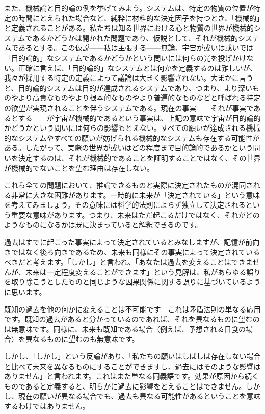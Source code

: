 \documentclass[a4paper,11pt,openany]{ltjsbook}
\begin{document}
また、機械論と目的論の例を挙げてみよう。システムは、特定の物質の位置が特定の時間にとえられた場合など、純粋に材料的な決定因子を持つとき、「機械的」と定義されることがある。私たちは知る世界における心と物質の世界が機械的システムであるかどうかは開かれた問題であり、仮説として、それが機械的システムであるとする。この仮説——私は主張する——無論、宇宙が或いは或いでは「目的論的」なシステムであるかどうかという問いには何らの光を投げかけない。正確に言えば、「目的論的」なシステムとは何かを定義するのは難しいが、我々が採用する特定の定義によって議論は大きく影響されない。大まかに言うと、目的論的システムは目的が達成されるシステムであり、つまり、より深いものやより高貴なものやより根本的なものやより普遍的なものなどと呼ばれる特定の欲望が実現されることを伴うシステムである。現在の事実——それが事実であるとする——が宇宙が機械的であるという事実は、上記の意味で宇宙が目的論的かどうかという問いには何らの影響もとえない。すべての願いが達成される機械的なシステムやすべての願いが妨げられる機械的なシステムも存在する可能性がある。したがって、実際の世界が或いはどの程度まで目的論的であるかという問いを決定するのは、それが機械的であることを証明することではなく、その世界が機械的でないことを望む理由は存在しない。

これら全ての問題において、推論できるものと実際に決定されたものが混同される非常に大きな困難があります。一時的に未来が「決定されている」という意味を考えてみましょう。その意味には科学的法則によらず独立して決定されるという重要な意味があります。つまり、未来はただ起こるだけではなく、それがどのようなものになるかは既に決まっていると解釈できるのです。

過去はすでに起こった事実によって決定されているとみなしますが、記憶が前向きではなく後ろ向きであるため、未来も同様にその事実によって決定されているべきだと考えます。「しかし」と言われ、「あなたは過去を変えることはできませんが、未来は一定程度変えることができます」という見解は、私があらゆる誤りを取り除こうとしたものと同じような因果関係に関する誤りに基づいているように思います。

既知の過去を他の何かに変えることは不可能です—これは矛盾法則の単なる応用です。既知の過去があると分かっているのであれば、それを異なるものに望むのは無意味です。同様に、未来も既知である場合（例えば、予想される日食の場合）を異なるものに望むのも無意味です。

しかし、「しかし」という反論があり、「私たちの願いはしばしば存在しない場合と比べて未来を異なるものにすることができますし、過去にはそのような影響はありません」と言われます。これはまた単なる同義語です。効果が原因から続くものであると定義すると、明らかに過去に影響をとえることはできません。しかし、現在の願いが異なる場合でも、過去も異なる可能性があるということを意味するわけではありません。
\end{document}
